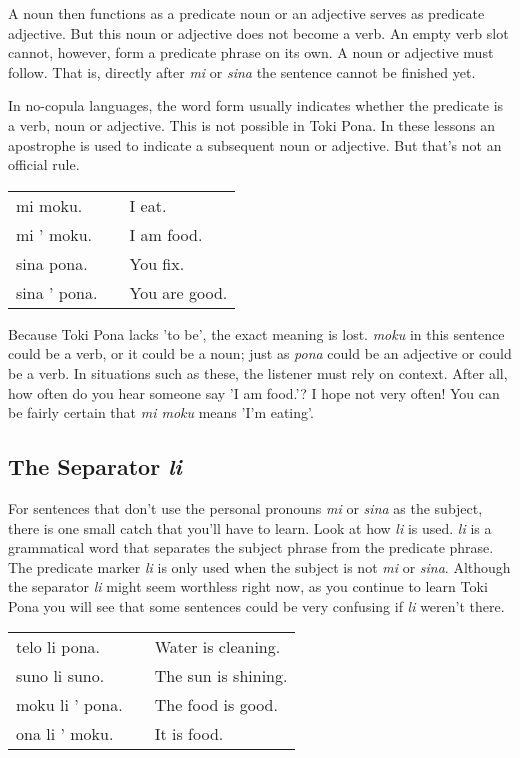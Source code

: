 A noun then functions as a predicate noun or an adjective serves as predicate adjective.
But this noun or adjective does not become a verb.
An empty verb slot cannot, however, form a predicate phrase on its own.
A noun or adjective must follow.
That is, directly after \textit{mi} or \textit{sina} the sentence cannot be finished yet.

In no-copula languages, the word form usually indicates whether the predicate is a verb, noun or adjective.
This is not possible in Toki Pona.
In these lessons an apostrophe is used to indicate a subsequent noun or adjective.
But that's not an official rule.

\begin{supertabular}{p{5cm}|ll}
    mi moku.     &  & I eat.        \\
    mi ' moku.   &  & I am food.    \\
    sina pona.   &  & You fix.      \\
    sina ' pona. &  & You are good. \\
\end{supertabular}

Because Toki Pona lacks 'to be', the exact meaning is lost.
\textit{moku} in this sentence could be a verb, or it could be a noun; just as \textit{pona} could be an adjective or could be a verb.
In situations such as these, the listener must rely on context.
After all, how often do you hear someone say 'I am food.'?
I hope not very often! You can be fairly certain that \textit{mi moku} means 'I'm eating'.

\newpage

\subsection*{The Separator \textit{li} }
For sentences that don't use the personal pronouns \textit{mi} or \textit{sina} as the subject, there is one small catch that you'll have to learn.
Look at how \textit{li} is used.
\textit{li} is a grammatical word that separates the subject phrase from the predicate phrase.
The predicate marker \textit{li} is only used when the subject is not \textit{mi} or \textit{sina}.
Although the separator \textit{li} might seem worthless right now, as you continue to learn Toki Pona you will see that some sentences could be very confusing if \textit{li} weren't there.

\begin{supertabular}{p{5cm}|ll}
    telo li pona.   &  & Water is cleaning.  \\
    suno li suno.   &  & The sun is shining. \\
    moku li ' pona. &  & The food is good.   \\
    ona li ' moku.  &  & It is food.         \\
\end{supertabular}

